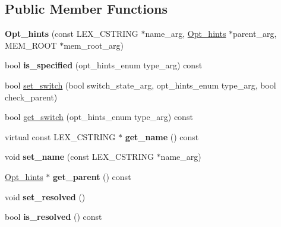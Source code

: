 \subsection*{Public Member Functions}
\begin{DoxyCompactItemize}
\item 
\mbox{\label{classOpt__hints_a539bf475d5a71e4de07ac3de97fc6c10}} 
{\bfseries Opt\+\_\+hints} (const L\+E\+X\+\_\+\+C\+S\+T\+R\+I\+NG $\ast$name\+\_\+arg, \mbox{\hyperlink{classOpt__hints}{Opt\+\_\+hints}} $\ast$parent\+\_\+arg, M\+E\+M\+\_\+\+R\+O\+OT $\ast$mem\+\_\+root\+\_\+arg)
\item 
\mbox{\label{classOpt__hints_ab2c704bbd058451d74cd59b41aed6493}} 
bool {\bfseries is\+\_\+specified} (opt\+\_\+hints\+\_\+enum type\+\_\+arg) const
\item 
bool \mbox{\hyperlink{classOpt__hints_a7c52f2fc6a14f6d7e1de516994d02f82}{set\+\_\+switch}} (bool switch\+\_\+state\+\_\+arg, opt\+\_\+hints\+\_\+enum type\+\_\+arg, bool check\+\_\+parent)
\item 
bool \mbox{\hyperlink{classOpt__hints_a0208b5809c213bd831cfb4f4bc8b6ade}{get\+\_\+switch}} (opt\+\_\+hints\+\_\+enum type\+\_\+arg) const
\item 
\mbox{\label{classOpt__hints_a33d504fa18f810b6d43530943836c731}} 
virtual const L\+E\+X\+\_\+\+C\+S\+T\+R\+I\+NG $\ast$ {\bfseries get\+\_\+name} () const
\item 
\mbox{\label{classOpt__hints_ad2e29d286dc053c4e774c1f523a24fe9}} 
void {\bfseries set\+\_\+name} (const L\+E\+X\+\_\+\+C\+S\+T\+R\+I\+NG $\ast$name\+\_\+arg)
\item 
\mbox{\label{classOpt__hints_a9e7753f68df31aa91b9b9aeca8ae5cf1}} 
\mbox{\hyperlink{classOpt__hints}{Opt\+\_\+hints}} $\ast$ {\bfseries get\+\_\+parent} () const
\item 
\mbox{\label{classOpt__hints_aba52b9701cb6f27402751db9a815c171}} 
void {\bfseries set\+\_\+resolved} ()
\item 
\mbox{\label{classOpt__hints_aca7704eeddc45adfede6d0967f672e13}} 
bool {\bfseries is\+\_\+resolved} () const
\item 

\end{DoxyCompactItemize}
